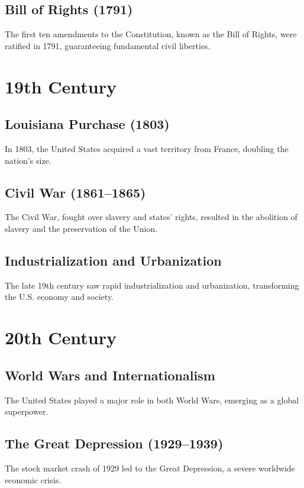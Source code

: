 \documentclass[a4paper,12pt]{book}
\begin{document}
\subsection{Bill of Rights (1791)}
\label{subsec:bill-of-rights}
The first ten amendments to the Constitution, known as the Bill of Rights, were ratified in 1791, guaranteeing fundamental civil liberties.

\section{19th Century}
\label{sec:19th-century}
\subsection{Louisiana Purchase (1803)}
\label{subsec:louisiana-purchase}
In 1803, the United States acquired a vast territory from France, doubling the nation’s size.

\subsection{Civil War (1861–1865)}
\label{subsec:civil-war}
The Civil War, fought over slavery and states’ rights, resulted in the abolition of slavery and the preservation of the Union.

\subsection{Industrialization and Urbanization}
\label{subsec:industrialization-urbanization}
The late 19th century saw rapid industrialization and urbanization, transforming the U.S. economy and society.

\section{20th Century}
\label{sec:20th-century}
\subsection{World Wars and Internationalism}
\label{subsec:world-wars-internationalism}
The United States played a major role in both World Wars, emerging as a global superpower.

\subsection{The Great Depression (1929–1939)}
\label{subsec:great-depression}
The stock market crash of 1929 led to the Great Depression, a severe worldwide economic crisis.
\end{document}
